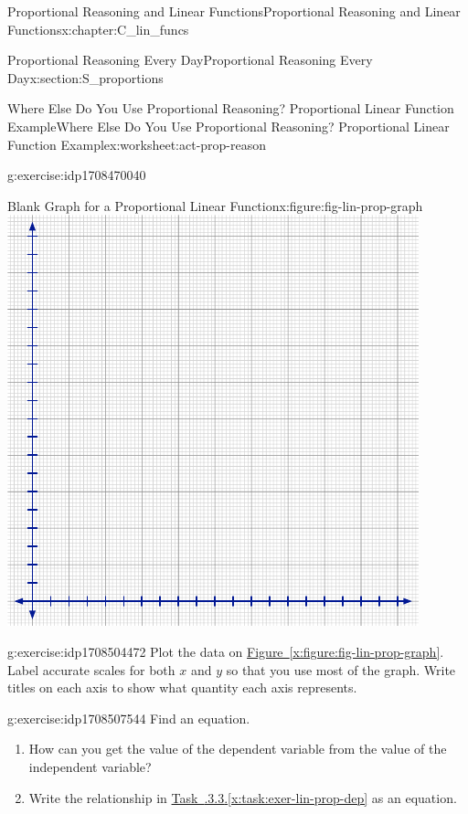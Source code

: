 \documentclass[oneside,10pt,]{book}
\newcommand{\xreffont}{\relax}
\numberwithin{equation}{chapter}
\begin{document}
\begin{chapterptx}{Proportional Reasoning and Linear Functions}{}{Proportional Reasoning and Linear Functions}{}{}{x:chapter:C_lin_funcs}
\begin{sectionptx}{Proportional Reasoning Every Day}{}{Proportional Reasoning Every Day}{}{}{x:section:S_proportions}
\begin{worksheet-subsection}{Where Else Do You Use Proportional Reasoning? Proportional Linear Function Example}{}{Where Else Do You Use Proportional Reasoning? Proportional Linear Function Example}{}{}{x:worksheet:act-prop-reason}
\begin{divisionexercise}{1}{}{}{g:exercise:idp1708470040}
\begin{sidebyside}{2}{0.025}{0.025}{0.05}
\begin{sbspanel}{0.7}
\begin{figureptx}{Blank Graph for a Proportional Linear Function}{x:figure:fig-lin-prop-graph}{}
\includegraphics[width=\linewidth]{external/blank-graph.pdf}
\tcblower
\end{figureptx}%
\end{sbspanel}%
\end{sidebyside}%
%
\end{divisionexercise}%
\begin{divisionexercise}{2}{}{}{g:exercise:idp1708504472}%
Plot the data on \hyperref[x:figure:fig-lin-prop-graph]{Figure~{\xreffont\ref{x:figure:fig-lin-prop-graph}}}. Label accurate scales for both \(x\) and \(y\) so that you use most of the graph. Write titles on each axis to show what quantity each axis represents.%
\end{divisionexercise}%
\begin{divisionexercise}{3}{}{}{g:exercise:idp1708507544}%
Find an equation.%
\begin{enumerate}[font=\bfseries,label=(\alph*),ref=\alph*]
\item\label{x:task:exer-lin-prop-dep}How can you get the value of the dependent variable from the value of the independent variable?%
\item{}Write the relationship in \hyperref[x:task:exer-lin-prop-dep]{Task~{\xreffont 2.5.3.3}.{\xreffont\ref{x:task:exer-lin-prop-dep}}} as an equation.%
\end{enumerate}

\end{divisionexercise}
\end{worksheet-subsection}
\end{sectionptx}
\end{chapterptx}
\end{document}
